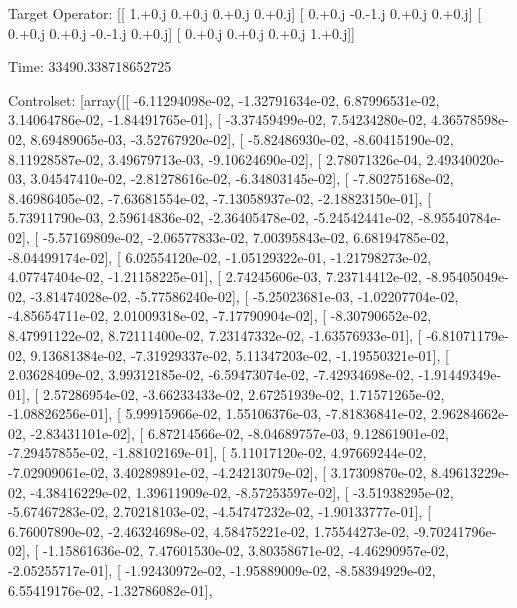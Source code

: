 \documentclass{article}
\begin{document}
Target Operator: [[ 1.+0.j  0.+0.j  0.+0.j  0.+0.j]
 [ 0.+0.j -0.-1.j  0.+0.j  0.+0.j]
 [ 0.+0.j  0.+0.j -0.-1.j  0.+0.j]
 [ 0.+0.j  0.+0.j  0.+0.j  1.+0.j]]

Time: 33490.338718652725

Controlset: [array([[ -6.11294098e-02,  -1.32791634e-02,   6.87996531e-02,
          3.14064786e-02,  -1.84491765e-01],
       [ -3.37459499e-02,   7.54234280e-02,   4.36578598e-02,
          8.69489065e-03,  -3.52767920e-02],
       [ -5.82486930e-02,  -8.60415190e-02,   8.11928587e-02,
          3.49679713e-03,  -9.10624690e-02],
       [  2.78071326e-04,   2.49340020e-03,   3.04547410e-02,
         -2.81278616e-02,  -6.34803145e-02],
       [ -7.80275168e-02,   8.46986405e-02,  -7.63681554e-02,
         -7.13058937e-02,  -2.18823150e-01],
       [  5.73911790e-03,   2.59614836e-02,  -2.36405478e-02,
         -5.24542441e-02,  -8.95540784e-02],
       [ -5.57169809e-02,  -2.06577833e-02,   7.00395843e-02,
          6.68194785e-02,  -8.04499174e-02],
       [  6.02554120e-02,  -1.05129322e-01,  -1.21798273e-02,
          4.07747404e-02,  -1.21158225e-01],
       [  2.74245606e-03,   7.23714412e-02,  -8.95405049e-02,
         -3.81474028e-02,  -5.77586240e-02],
       [ -5.25023681e-03,  -1.02207704e-02,  -4.85654711e-02,
          2.01009318e-02,  -7.17790904e-02],
       [ -8.30790652e-02,   8.47991122e-02,   8.72111400e-02,
          7.23147332e-02,  -1.63576933e-01],
       [ -6.81071179e-02,   9.13681384e-02,  -7.31929337e-02,
          5.11347203e-02,  -1.19550321e-01],
       [  2.03628409e-02,   3.99312185e-02,  -6.59473074e-02,
         -7.42934698e-02,  -1.91449349e-01],
       [  2.57286954e-02,  -3.66233433e-02,   2.67251939e-02,
          1.71571265e-02,  -1.08826256e-01],
       [  5.99915966e-02,   1.55106376e-03,  -7.81836841e-02,
          2.96284662e-02,  -2.83431101e-02],
       [  6.87214566e-02,  -8.04689757e-03,   9.12861901e-02,
         -7.29457855e-02,  -1.88102169e-01],
       [  5.11017120e-02,   4.97669244e-02,  -7.02909061e-02,
          3.40289891e-02,  -4.24213079e-02],
       [  3.17309870e-02,   8.49613229e-02,  -4.38416229e-02,
          1.39611909e-02,  -8.57253597e-02],
       [ -3.51938295e-02,  -5.67467283e-02,   2.70218103e-02,
         -4.54747232e-02,  -1.90133777e-01],
       [  6.76007890e-02,  -2.46324698e-02,   4.58475221e-02,
          1.75544273e-02,  -9.70241796e-02],
       [ -1.15861636e-02,   7.47601530e-02,   3.80358671e-02,
         -4.46290957e-02,  -2.05255717e-01],
       [ -1.92430972e-02,  -1.95889009e-02,  -8.58394929e-02,
          6.55419176e-02,  -1.32786082e-01],
\end{document}
